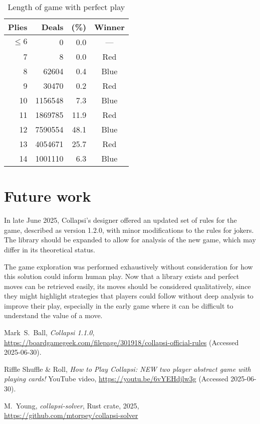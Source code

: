 \documentclass[a4paper, twocolumn]{article}
\begin{document}
\begin{table}[h]
  \centering
  \begin{tabular}{r r r c}
    \hline
    Plies & Deals & (\%) & Winner \\
    \hline
    $\leq 6$ & 0 & 0.0 & ---\\
    7 & 8 & 0.0 & Red \\
    8 & 62604 & 0.4 & Blue \\
    9 & 30470 & 0.2 & Red \\
    10 & 1156548 & 7.3 & Blue \\
    11 & 1869785 & 11.9 & Red \\
    12 & 7590554 & 48.1 & Blue \\
    13 & 4054671 & 25.7 & Red \\
    14 & 1001110 & 6.3 & Blue \\
    \hline
  \end{tabular}
  \caption{Length of game with perfect play}
  \label{tab:game-length}
\end{table}



\section{Future work}

In late June 2025, Collapsi's designer offered an updated set of rules for the
game, described as version 1.2.0, with minor modifications to the rules for
jokers. The library should be expanded to allow for analysis of the new game,
which may differ in its theoretical status.

The game exploration was performed exhaustively without consideration for how
this solution could inform human play. Now that a library exists and perfect
moves can be retrieved easily, its moves should be considered qualitatively,
since they might highlight strategies that players could follow without deep
analysis to improve their play, especially in the early game where it can be
difficult to understand the value of a move.


\begin{thebibliography}{9}

  Mark~S.~Ball,
  \textit{Collapsi 1.1.0},
  \url{https://boardgamegeek.com/filepage/301918/collapsi-official-rules}
  (Accessed 2025-06-30).

  Riffle Shuffle \& Roll,
  \textit{How to Play Collapsi: NEW two player abstract game with playing cards!}
  YouTube video,
  \url{https://youtu.be/6vYEHdjlw3g}
  (Accessed 2025-06-30).

  M.~Young,
  \textit{collapsi-solver},
  Rust crate,
  2025,
  \url{https://github.com/mtorpey/collapsi-solver}

\end{thebibliography}
\end{document}
